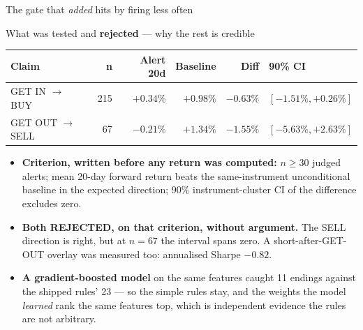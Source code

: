 \documentclass[aspectratio=169,11pt]{beamer}
\begin{document}
\begin{frame}{The gate that \emph{added} hits by firing less often}
\end{frame}

\begin{frame}{What was tested and \textbf{rejected} --- why the rest is credible}
  \small
  \begin{table}
    \begin{tabular}{@{}lrrrrl@{}}
      \toprule
      \textbf{Claim} & \textbf{n} & \textbf{Alert 20d} & \textbf{Baseline}
      & \textbf{Diff} & \textbf{90\% CI} \\
      \midrule
      GET IN $\rightarrow$ BUY   & 215 & $+0.34\%$ & $+0.98\%$ & $-0.63\%$
        & $[-1.51\%, +0.26\%]$ \\
      GET OUT $\rightarrow$ SELL & 67  & $-0.21\%$ & $+1.34\%$ & $-1.55\%$
        & $[-5.63\%, +2.63\%]$ \\
      \bottomrule
    \end{tabular}
  \end{table}
  \begin{itemize}\footnotesize
    \item \textbf{Criterion, written before any return was computed:}
      $n \geq 30$ judged alerts; mean 20-day forward return beats the
      same-instrument unconditional baseline in the expected direction; 90\%
      instrument-cluster CI of the difference excludes zero.
    \item \textbf{Both REJECTED, on that criterion, without argument.} The SELL
      direction is right, but at $n=67$ the interval spans zero. A
      short-after-GET-OUT overlay was measured too: annualised Sharpe $-0.82$.
    \item \textbf{A gradient-boosted model} on the same features caught 11
      endings against the shipped rules' 23 --- so the simple rules stay, and
      the weights the model \emph{learned} rank the same features top, which is
      independent evidence the rules are not arbitrary.
  \end{itemize}
\end{frame}
\end{document}
